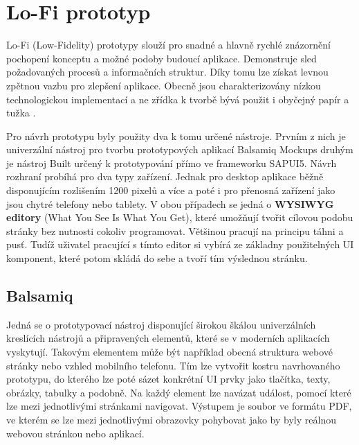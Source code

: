 \documentclass[thesis=M,czech]{FITthesis}[2012/06/26]
\begin{document}
\section{Lo-Fi prototyp}
Lo-Fi (Low-Fidelity) prototypy slouží pro snadné a hlavně rychlé znázornění pochopení konceptu a možné podoby budoucí aplikace. Demonstruje sled požadovaných procesů a informačních struktur. Díky tomu lze získat levnou zpětnou vazbu pro zlepšení aplikace. Obecně jsou charakterizovány nízkou technologickou implementací a ne zřídka k tvorbě bývá použit i obyčejný papír a tužka \cite{lofi}. 

Pro návrh prototypu byly použity dva k tomu určené nástroje. Prvním z nich je univerzální nástroj pro tvorbu prototypových aplikací Balsamiq Mockups \cite{balsamiq} druhým je nástroj Built \cite{builtme} určený k prototypování přímo ve frameworku SAPUI5. Návrh rozhraní probíhá pro dva typy zařízení. Jednak pro desktop aplikace běžně disponujícím rozlišením 1200 pixelů a více a poté i pro přenosná zařízení jako jsou chytré telefony nebo tablety. V obou případech se jedná o \textbf{WYSIWYG editory} (What You See Is What You Get), které umožňují tvořit cílovou podobu stránky bez nutnosti cokoliv programovat. Většinou pracují na principu táhni a pusť. Tudíž uživatel pracující s tímto editor si vybírá ze základny použitelných UI komponent, které potom skládá do sebe a tvoří tím výslednou stránku. 
\subsection{Balsamiq}
Jedná se o prototypovací nástroj disponující širokou škálou univerzálních kreslících nástrojů a připravených elementů, které se v moderních aplikacích vyskytují. Takovým elementem může být například obecná struktura webové stránky nebo vzhled mobilního telefonu. Tím lze vytvořit kostru navrhovaného prototypu, do kterého lze poté sázet konkrétní UI prvky jako tlačítka, texty, obrázky, tabulky a podobně. Na každý element lze navázat událost, pomocí které lze mezi jednotlivými stránkami navigovat. Výstupem je soubor ve formátu PDF, ve kterém se lze mezi jednotlivými obrazovky pohybovat jako by byly reálnou webovou stránkou nebo aplikací. 
\end{document}

